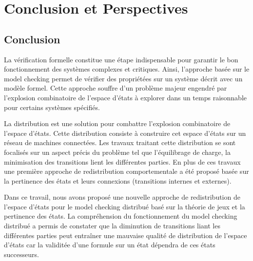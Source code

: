 
\chapter*{Conclusion et Perspectives}

\section*{Conclusion}
La vérification formelle constitue une étape indispensable pour garantir le bon fonctionnement des systèmes complexes et critiques. Ainsi, l’approche basée sur le model checking permet de vérifier des propriétées sur un système décrit avec un modèle formel. Cette approche souffre d'un problème majeur engendré par l'explosion combinatoire de l'espace d'états à explorer  dans un temps raisonnable pour certains systèmes spécifiés.

La distribution est une solution pour combattre l'explosion combinatoire de l'espace d'états. Cette distribution consiste à construire cet espace d'états sur un réseau de machines connectées. Les travaux traitant cette distribution se sont focalisés sur un aspect précis du problème tel que l’équilibrage de charge, la minimisation des transitions lient les différentes parties. En plus de ces travaux une première approche de redistribution comportementale a été proposé basée sur la pertinence des états et leurs connexions (transitions internes et externes).

Dans ce travail, nous avons proposé une nouvelle approche de redistribution de l'espace d'états pour le model checking distribué basé sur la théorie de jeux et la pertinence des états. La compréhension du fonctionnement du model checking distribué a permis de constater que la diminution de transitions liant les différentes parties peut entraîner une mauvaise qualité de distribution de l'espace d'états car la validitée d'une formule sur un état dépendra de ces états successeurs.

